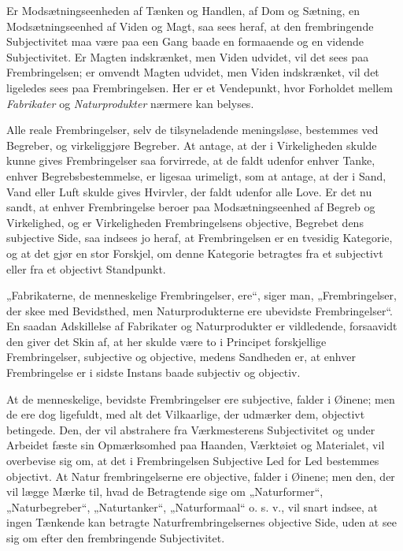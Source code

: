 \documentclass[12pt]{book}
\newcommand{\opage}[1]{\marginnote{\footnotesize\textit{[#1]}}}
\begin{document}
Er Modsætningseenheden af Tænken og Handlen, af
Dom og Sætning, en Modsætningseenhed af Viden og Magt,
saa sees heraf, at den frembringende Subjectivitet maa være
\opage{138}paa een Gang baade en formaaende og en vidende Subjectivitet.
Er Magten indskrænket, men Viden udvidet, vil det
sees paa Frembringelsen; er omvendt Magten udvidet, men
Viden indskrænket, vil det ligeledes sees paa Frembringelsen.
Her er et Vendepunkt, hvor Forholdet mellem \emph{Fabrikater}
og \emph{Naturprodukter} nærmere kan belyses.

Alle reale Frembringelser, selv de tilsyneladende meningsløse,
bestemmes ved Begreber, og virkeliggjøre Begreber. At
antage, at der i Virkeligheden skulde kunne gives Frembringelser
saa forvirrede, at de faldt udenfor enhver Tanke, enhver
Begrebsbestemmelse, er ligesaa urimeligt, som at antage, at
der i Sand, Vand eller Luft skulde gives Hvirvler, der faldt
udenfor alle Love. Er det nu sandt, at enhver Frembringelse
beroer paa Modsætningseenhed af Begreb og Virkelighed, og
er Virkeligheden Frembringelsens objective, Begrebet dens subjective
Side, saa indsees jo heraf, at Frembringelsen er en
tvesidig Kategorie, og at det gjør en stor Forskjel, om denne
Kategorie betragtes fra et subjectivt eller fra et objectivt
Standpunkt.

„Fabrikaterne, de menneskelige Frembringelser, ere“, siger
man, „Frembringelser, der skee med Bevidsthed, men Naturprodukterne
ere ubevidste Frembringelser“. En saadan Adskillelse
af Fabrikater og Naturprodukter er vildledende, forsaavidt
den giver det Skin af, at her skulde være to i Principet
forskjellige Frembringelser, subjective og objective, medens
Sandheden er, at enhver Frembringelse er i sidste Instans
baade subjectiv og objectiv.

At de menneskelige, bevidste Frembringelser ere subjective,
falder i Øinene; men de ere dog ligefuldt, med alt det Vilkaarlige,
der udmærker dem, objectivt betingede. Den, der
vil abstrahere fra Værkmesterens Subjectivitet og under Arbeidet
fæste sin Opmærksomhed paa Haanden, Værktøiet og
Materialet, vil overbevise sig om, at det i Frembringelsen
Subjective Led for Led bestemmes objectivt. At Natur%
\opage{139}frembringelserne ere objective, falder i Øinene; men den, der vil
lægge Mærke til, hvad de Betragtende sige om „Naturformer“,
„Naturbegreber“, „Naturtanker“, „Naturformaal“ o. s. v.,
vil snart indsee, at ingen Tænkende kan betragte Naturfrembringelsernes
objective Side, uden at see sig om efter den
frembringende Subjectivitet.
\end{document}
